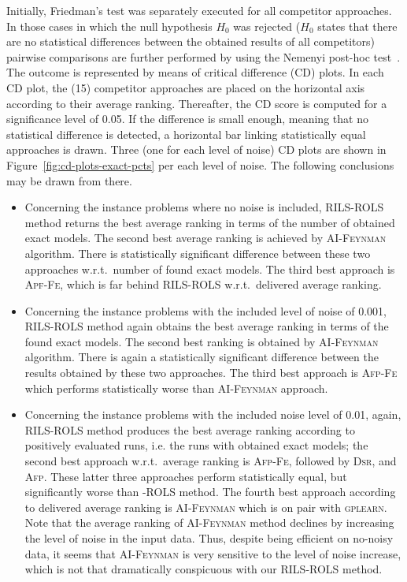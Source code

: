 \documentclass[a4paper,12pt]{elsarticle}
\begin{document}
Initially, Friedman’s test was separately executed for all competitor approaches.      In those cases in which the null hypothesis $H_0$ was rejected ($H_0$ states that there are no statistical differences between the obtained results of all competitors) pairwise comparisons are further performed by using the Nemenyi post-hoc test~\cite{pohlert2014pairwise}. The outcome is represented by means of critical difference (CD) plots. In each CD plot, the (15) competitor approaches are placed on the horizontal axis according to their average ranking. Thereafter, the CD score is computed for a significance level of 0.05. If the difference is small enough, meaning that no statistical difference is detected, a horizontal bar linking statistically equal approaches is drawn.   Three (one for each level of noise) CD plots are shown in Figure~\ref{fig:cd-plots-exact-pcts} per each level of noise. The following conclusions may be drawn from there.

\begin{itemize}
	\item  Concerning the instance problems where no noise is included, \textsc{RILS}-\textsc{ROLS} method returns the best average ranking in terms of the number of obtained exact models.  The second best average ranking is achieved by \textsc{AI-Feynman} algorithm. There is  statistically significant difference between these two approaches w.r.t.\ number of found exact models. The third best approach is \textsc{Apf-Fe},  which is far behind \textsc{RILS}-\textsc{ROLS} w.r.t.\ delivered average ranking.  
	\item    Concerning the instance problems with the included  level of noise of 0.001, \textsc{RILS}-\textsc{ROLS} method again obtains the best average ranking in terms of the found exact models.   The second best ranking is obtained by \textsc{AI-Feynman} algorithm. There is again a statistically significant difference between the results obtained by these two approaches. The third best approach is \textsc{Afp-Fe} which performs statistically worse than \textsc{AI-Feynman} approach.  
	\item  Concerning the instance problems with the included noise level of  0.01, again, \textsc{RILS-ROLS} method produces the best average ranking according to positively evaluated runs, i.e. the runs with obtained exact models; the second best approach w.r.t.\ average ranking is \textsc{Afp-Fe}, followed by \textsc{Dsr}, and \textsc{Afp}. These latter three approaches perform statistically equal, but significantly worse than -\textsc{ROLS} method. 	The fourth best approach according to delivered average ranking is \textsc{AI-Feynman} which is on pair with \textsc{gplearn}. Note that the average ranking of \textsc{AI-Feynman} method declines by increasing  the level of noise in the input data. Thus, despite being efficient on no-noisy data, it seems that \textsc{AI-Feynman} is very sensitive to the level of noise increase, which is not that dramatically conspicuous with our \textsc{RILS}-\textsc{ROLS} method.   
	
\end{itemize}
\end{document}
